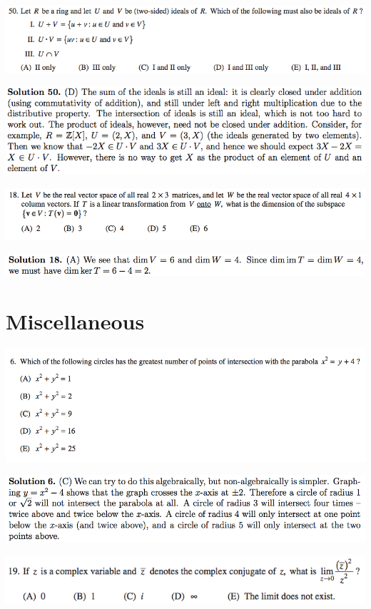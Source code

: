 \documentclass{article}
\begin{document}
\includegraphics[scale=0.65]{1268_50}

\includegraphics[scale=0.65]{1268_50s}

\includegraphics[scale=0.5]{0568_18}

\includegraphics[scale=0.5]{0568_18s}

\pagebreak

\section{Miscellaneous}

\includegraphics[scale=0.5]{0568_6}

\includegraphics[scale=0.5]{0568_6s}

\includegraphics[scale=0.65]{1268_19}
\end{document}
